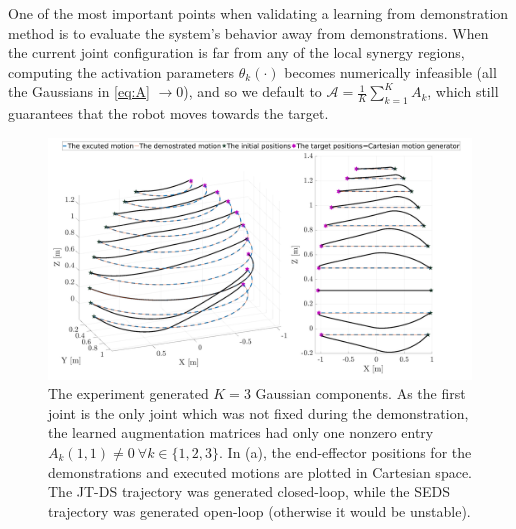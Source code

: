 \documentclass[letterpaper, 10 pt, journal, twoside, fleqn]{IEEEtran}
\begin{document}
One of the most important points when validating a learning from demonstration method is to evaluate the system's behavior away from demonstrations.
 When the current joint configuration is far from any of the local synergy regions, computing the activation parameters $\theta_k(\cdot)$ becomes numerically infeasible (all the Gaussians in \eqref{eq:A} $\rightarrow 0$), and so we default to $\mathcal{A} = \frac{1}{K}\sum\limits_{k=1}^{K}A_k$, which still guarantees that the robot moves towards the target. %

\begin{figure}[t]
		\includegraphics[width=\linewidth]{../Pic/cropped_Sing_1.pdf}
	\caption{The experiment generated $K=3$ Gaussian components. As the first joint is the only joint which was not fixed during the demonstration, the learned augmentation matrices had only one nonzero entry $A_k(1,1)\neq0~\forall k\in \{1, 2, 3\} $.  In (a), the end-effector positions for the demonstrations and executed motions are plotted in Cartesian space. The JT-DS trajectory was generated closed-loop, while the SEDS trajectory was generated open-loop (otherwise it would be unstable).} %
			\label{fig:Sin}
	\vspace{-20pt}
\end{figure}
\end{document}
